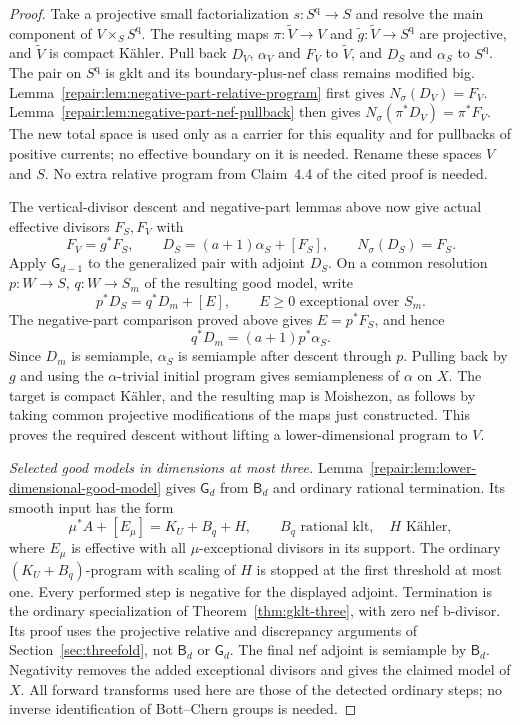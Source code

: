 \begin{proof}
Take a projective small factorialization $s:S^{\mathrm q}\to S$
and resolve the main component of $V\times_S S^{\mathrm q}$.
The resulting maps $\pi:\widetilde V\to V$ and
$\widetilde g:\widetilde V\to S^{\mathrm q}$ are projective,
and $\widetilde V$ is compact K\"ahler. Pull back $D_V$,
$\alpha_V$ and $F_V$ to $\widetilde V$, and $D_S$ and
$\alpha_S$ to $S^{\mathrm q}$. The pair on $S^{\mathrm q}$ is
gklt and its boundary-plus-nef class remains modified big.
Lemma~\ref{repair:lem:negative-part-relative-program} first gives
$N_\sigma(D_V)=F_V$. Lemma~\ref{repair:lem:negative-part-nef-pullback} then gives
$N_\sigma(\pi^*D_V)=\pi^*F_V$. The new total space is used only as a
carrier for this equality and for pullbacks of positive currents;
no effective boundary on it is needed. Rename these spaces $V$
and $S$. No extra relative program from Claim~4.4 of the cited proof is needed.

The vertical-divisor descent and negative-part lemmas above now
give actual effective divisors $F_S,F_V$ with
\[
 F_V=g^*F_S,\qquad
 D_S=(a+1)\alpha_S+[F_S],\qquad N_\sigma(D_S)=F_S.
\]
Apply $\mathsf G_{d-1}$ to the generalized pair with adjoint $D_S$.
On a common resolution $p:W\to S$, $q:W\to S_m$ of the resulting
good model, write
\[
 p^*D_S=q^*D_m+[E],\qquad E\geq0
 \text{ exceptional over }S_m.
\]
The negative-part comparison proved above gives
$E=p^*F_S$, and hence
\[
 q^*D_m=(a+1)p^*\alpha_S.
\]
Since $D_m$ is semiample, $\alpha_S$ is semiample after descent
through $p$. Pulling back by $g$ and using the
$\alpha$-trivial initial program gives semiampleness of
$\alpha$ on $X$. The target is compact K\"ahler, and the
resulting map is Moishezon, as follows by taking common projective
modifications of the maps just constructed. This proves the required descent without lifting a lower-dimensional
program to $V$.

\smallskip\noindent
\emph{Selected good models in dimensions at most three.}
Lemma~\ref{repair:lem:lower-dimensional-good-model} gives
$\mathsf G_d$ from $\mathsf B_d$ and ordinary rational
termination. Its smooth input has the form
\[
 \mu^*A+[E_\mu]=K_U+B_q+H,
 \qquad B_q\text{ rational klt},\quad H\text{ K\"ahler},
\]
where $E_\mu$ is effective with all $\mu$-exceptional divisors in
its support. The ordinary $(K_U+B_q)$-program with scaling of $H$
is stopped at the first threshold at most one. Every performed
step is negative for the displayed adjoint. Termination is the
ordinary specialization of Theorem~\ref{thm:gklt-three},
with zero nef b-divisor. Its proof uses the projective relative and
discrepancy arguments of Section~\ref{sec:threefold}, not
$\mathsf B_d$ or $\mathsf G_d$.
The final nef adjoint is semiample by $\mathsf B_d$.
Negativity removes the added exceptional divisors and gives the
claimed model of $X$. All forward transforms used here are those
of the detected ordinary steps; no inverse identification of
Bott--Chern groups is needed.


\end{proof}
